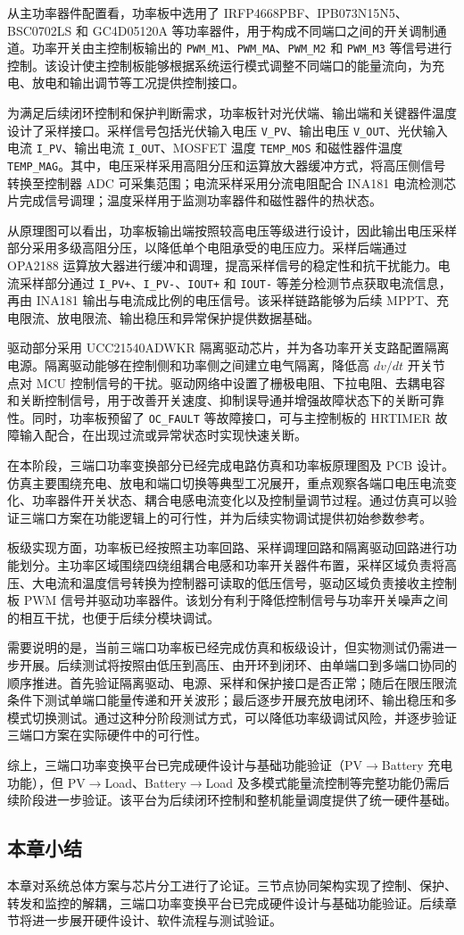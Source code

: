 从主功率器件配置看，功率板中选用了 IRFP4668PBF、IPB073N15N5、BSC0702LS 和 GC4D05120A 等功率器件，用于构成不同端口之间的开关调制通道。功率开关由主控制板输出的 \texttt{PWM\_M1}、\texttt{PWM\_MA}、\texttt{PWM\_M2} 和 \texttt{PWM\_M3} 等信号进行控制。该设计使主控制板能够根据系统运行模式调整不同端口的能量流向，为充电、放电和输出调节等工况提供控制接口。

为满足后续闭环控制和保护判断需求，功率板针对光伏端、输出端和关键器件温度设计了采样接口。采样信号包括光伏输入电压 \texttt{V\_PV}、输出电压 \texttt{V\_OUT}、光伏输入电流 \texttt{I\_PV}、输出电流 \texttt{I\_OUT}、MOSFET 温度 \texttt{TEMP\_MOS} 和磁性器件温度 \texttt{TEMP\_MAG}。其中，电压采样采用高阻分压和运算放大器缓冲方式，将高压侧信号转换至控制器 ADC 可采集范围；电流采样采用分流电阻配合 INA181 电流检测芯片完成信号调理；温度采样用于监测功率器件和磁性器件的热状态。

从原理图可以看出，功率板输出端按照较高电压等级进行设计，因此输出电压采样部分采用多级高阻分压，以降低单个电阻承受的电压应力。采样后端通过 OPA2188 运算放大器进行缓冲和调理，提高采样信号的稳定性和抗干扰能力。电流采样部分通过 \texttt{I\_PV+}、\texttt{I\_PV-}、\texttt{IOUT+} 和 \texttt{IOUT-} 等差分检测节点获取电流信息，再由 INA181 输出与电流成比例的电压信号。该采样链路能够为后续 MPPT、充电限流、放电限流、输出稳压和异常保护提供数据基础。

驱动部分采用 UCC21540ADWKR 隔离驱动芯片，并为各功率开关支路配置隔离电源。隔离驱动能够在控制侧和功率侧之间建立电气隔离，降低高 $dv/dt$ 开关节点对 MCU 控制信号的干扰。驱动网络中设置了栅极电阻、下拉电阻、去耦电容和关断控制信号，用于改善开关速度、抑制误导通并增强故障状态下的关断可靠性。同时，功率板预留了 \texttt{OC\_FAULT} 等故障接口，可与主控制板的 HRTIMER 故障输入配合，在出现过流或异常状态时实现快速关断。

在本阶段，三端口功率变换部分已经完成电路仿真和功率板原理图及 PCB 设计。仿真主要围绕充电、放电和端口切换等典型工况展开，重点观察各端口电压电流变化、功率器件开关状态、耦合电感电流变化以及控制量调节过程。通过仿真可以验证三端口方案在功能逻辑上的可行性，并为后续实物调试提供初始参数参考。

板级实现方面，功率板已经按照主功率回路、采样调理回路和隔离驱动回路进行功能划分。主功率区域围绕四绕组耦合电感和功率开关器件布置，采样区域负责将高压、大电流和温度信号转换为控制器可读取的低压信号，驱动区域负责接收主控制板 PWM 信号并驱动功率器件。该划分有利于降低控制信号与功率开关噪声之间的相互干扰，也便于后续分模块调试。

需要说明的是，当前三端口功率板已经完成仿真和板级设计，但实物测试仍需进一步开展。后续测试将按照由低压到高压、由开环到闭环、由单端口到多端口协同的顺序推进。首先验证隔离驱动、电源、采样和保护接口是否正常；随后在限压限流条件下测试单端口能量传递和开关波形；最后逐步开展充放电闭环、输出稳压和多模式切换测试。通过这种分阶段测试方式，可以降低功率级调试风险，并逐步验证三端口方案在实际硬件中的可行性。

综上，三端口功率变换平台已完成硬件设计与基础功能验证（PV$\rightarrow$Battery 充电功能），但 PV$\rightarrow$Load、Battery$\rightarrow$Load 及多模式能量流控制等完整功能仍需后续阶段进一步验证。该平台为后续闭环控制和整机能量调度提供了统一硬件基础。

\subsection{本章小结}

本章对系统总体方案与芯片分工进行了论证。三节点协同架构实现了控制、保护、转发和监控的解耦，三端口功率变换平台已完成硬件设计与基础功能验证。后续章节将进一步展开硬件设计、软件流程与测试验证。
